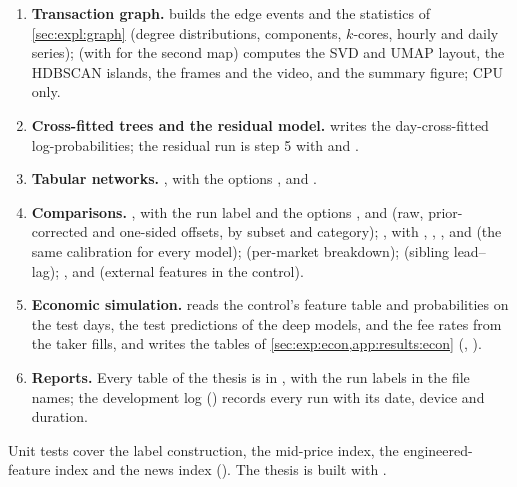 \begin{enumerate}[nosep]
  and mutual-information results and the market clustering of \cref{ch:structure}, with a
  ; CPU only, about twenty-five minutes per horizon.
  \item \textbf{Transaction graph.}  
    builds the edge events and the statistics of \cref{sec:expl:graph}
  (degree distributions, components, $k$-cores, hourly and daily series);
   (with  for the second map) computes
  the SVD and UMAP layout,  the HDBSCAN islands,  the
  frames and the video, and  the summary figure; CPU only.
  \item \textbf{Cross-fitted trees and the residual model.}  
  writes the day-cross-fitted log-probabilities; the residual run is step 5 with
   and .
  \item \textbf{Tabular networks.}  , with the options
  ,  and .
  \item \textbf{Comparisons.}  , with the run label and the options
  ,  and  (raw, prior-corrected and
  one-sided offsets, by subset and category); , with
  , , ,  and
   (the same calibration for every model);
   (per-market breakdown);
   (sibling lead--lag);
  ,  and
   (external features in the control).
  \item \textbf{Economic simulation.}   
    reads
  the control's feature table and probabilities on the test days, the test predictions of
  the deep models, and the fee rates from the taker fills, and writes the tables of
  \cref{sec:exp:econ,app:results:econ} (, ).
  \item \textbf{Reports.}  Every table of the thesis is in
  , with the run labels in the file names; the
  development log () records every run with its date, device
  and duration.
\end{enumerate}

Unit tests cover the label construction, the mid-price index, the engineered-feature index and
the news index ().  The thesis is built with .
